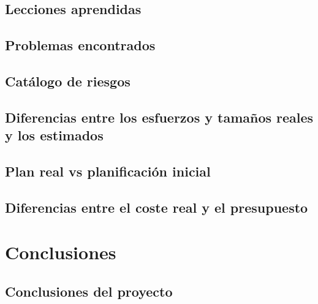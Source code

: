 \documentclass[10pt,spanish]{article}
\let\stdsection\section
\renewcommand\section{\newpage\stdsection}
\begin{document}
\subsection{Lecciones aprendidas}


\subsection{Problemas encontrados}


\subsection{Catálogo de riesgos}


\subsection{Diferencias entre los esfuerzos y tamaños reales y los estimados}


\subsection{Plan real vs planificación inicial}


\subsection{Diferencias entre el coste real y el presupuesto}



\section{Conclusiones}


\subsection{Conclusiones del proyecto}

\end{document}

